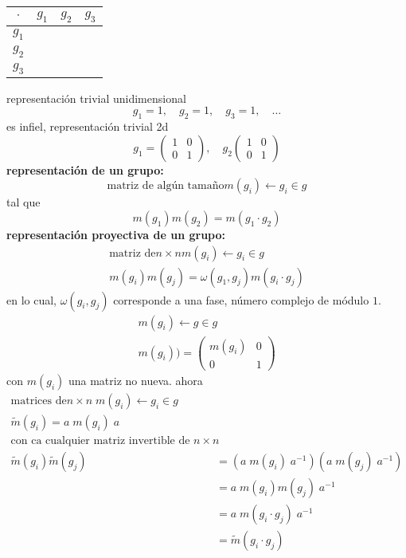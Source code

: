\documentclass[../main.tex]{subfiles}
\begin{document}
\begin{table}
\begin{tabular}{c|c|c|c}
  $\cdot$ & $g_1$ & $g_2$ & $g_3$ \\ \hline 
  $g_1$ & & & \\ \hline
  $g_2$ & & & \\ \hline
  $g_3$ & & & \\ 
\end{tabular}
\end{table}
representación trivial unidimensional
\begin{equation*}
  g_1=1 , \quad g_2=1 , \quad g_3=1 ,\quad \dots
\end{equation*}
es infiel, representación trivial 2d
\begin{equation*}
  g_1 = \begin{pmatrix} 1 & 0 \\ 0 & 1 \end{pmatrix} , \quad g_2 \begin{pmatrix} 1 & 0 \\ 0 & 1 \end{pmatrix}
\end{equation*}
\textbf{representación de un grupo:}
\begin{equation*}
  \text{matriz de algún tamaño} m(g_i) \leftarrow g_i \in g 
\end{equation*}
tal que
\begin{equation*}
  m(g_1)m(g_2) = m (g_1\cdot g_2)
\end{equation*}
\textbf{representación proyectiva de un grupo:}
\begin{align*}
  \text{matriz de} n\times n m(g_i) \leftarrow g_i \in g \\
  m(g_i)m(g_j) = \omega(g_1, g_j) m (g_i\cdot g_j) 
\end{align*}
en lo cual, $\omega(g_i,g_j)$ corresponde a una fase, número complejo de módulo $1$. \\
\begin{align*}
  m(g_i) \leftarrow g\in g  \\
  m(g_i) ) = \begin{pmatrix} m(g_i) & 0 \\ 0 & 1 \end{pmatrix} 
\end{align*}
con $m(g_i)$ una matriz no nueva. ahora
\begin{align*}
  \text{matrices de} n\times n \; m(g_i) \longleftarrow g_i \in g \\
  \tilde{m}(g_i)  = a\;m(g_i)\; a \\
  \text{con ca cualquier matriz invertible de }n\times n \\
  \tilde{m}(g_i) \tilde{m}(g_j) & = (a \; m(g_i) \; a^{-1}) (a \; m(g_j) \; a^{-1}) \\
  & = a \; m(g_i) m(g_j)\; a^{-1} \\
  & = a\; m(g_i \cdot g_j) \; a^{-1} \\
  & = \tilde{m} (g_i \cdot g_j) 
\end{align*}
\end{document}
